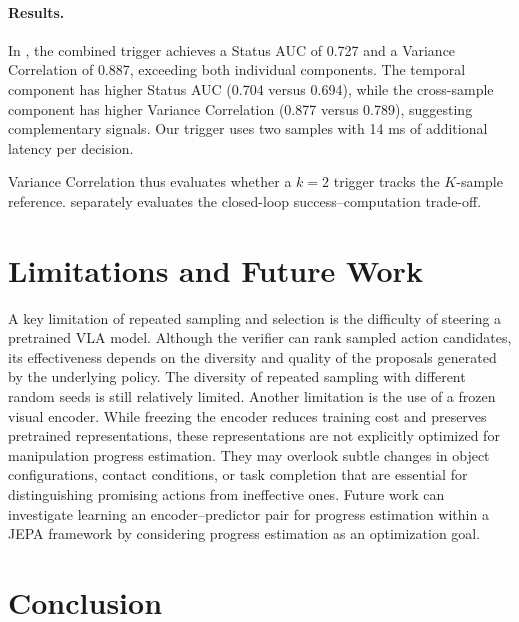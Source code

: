\documentclass[10pt,twocolumn,letterpaper]{article}
\begin{document}
\paragraph{Results.} In , the combined trigger achieves a Status AUC of 0.727 and a Variance Correlation of 0.887, exceeding both individual components. The temporal component has higher Status AUC (0.704 versus 0.694), while the cross-sample component has higher Variance Correlation (0.877 versus 0.789), suggesting complementary signals. Our trigger uses two samples with 14 ms of additional latency per decision.

Variance Correlation thus evaluates whether a $k=2$ trigger tracks the $K$-sample reference.  separately evaluates the closed-loop success--computation trade-off.

\section{Limitations and Future Work}

A key limitation of repeated sampling and selection is the difficulty of steering a pretrained VLA model. Although the verifier can rank sampled action candidates, its effectiveness depends on the diversity and quality of the proposals generated by the underlying policy. The diversity of repeated sampling with different random seeds is still relatively limited.
Another limitation is the use of a frozen visual encoder. While freezing the encoder reduces training cost and preserves pretrained representations, these representations are not explicitly optimized for manipulation progress estimation. They may overlook subtle changes in object configurations, contact conditions, or task completion that are essential for distinguishing promising actions from ineffective ones.
Future work can investigate learning an encoder--predictor pair for progress estimation within a JEPA framework by considering progress estimation as an optimization goal.

\section{Conclusion}
\end{document}

